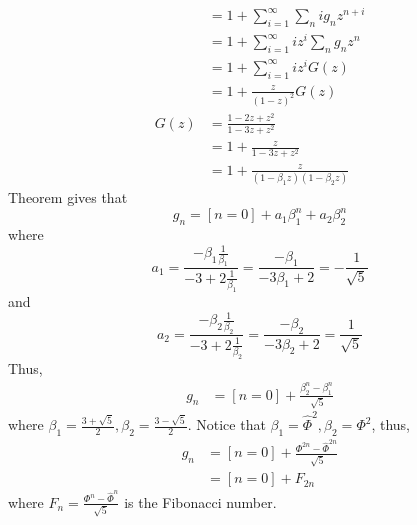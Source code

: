 \documentclass[a4paper,12pt]{article}
\makeatletter
\newtheorem*{solution}{Solution}
\theoremstyle{definition}
\renewenvironment{solution}[1][Solution] {\par\pushQED{\qed}\normalfont\topsep6\p@\@plus6\p@\relax\trivlist\item[\hskip\labelsep\bfseries#1\@addpunct{.}]\ignorespaces}{\popQED\endtrivlist\@endpefalse} \makeatother
\newenvironment{problems}{\begin{list}{}{\renewcommand{\makelabel}[1]{\textbf{##1}\hfil}}}{\end{list}}
\makeatother
\begin{document}
\begin{problems}
\begin{solution}
\begin{align*}
            &= 1 + \sum_{i=1}^\infty \sum_n ig_nz^{n+i}\\
            &= 1 + \sum_{i=1}^\infty iz^i\sum_n g_nz^n\\
            &= 1 + \sum_{i=1}^{\infty} iz^{i}G(z)\\
            &= 1 + \frac{z}{(1-z)^2}G(z)\\
            G(z) &= \frac{1-2z+z^2}{1-3z+z^2} \\
            &= 1 + \frac{z}{1-3z+z^2} \\
            &= 1+ \frac{z}{(1-\beta_1 z)(1-\beta_2 z)}
        \end{align*}
        Theorem gives that
        \begin{equation*}
            g_n = [n=0] + a_1 \beta_1^n + a_2 \beta_2^n
        \end{equation*}
        where
        \begin{equation*}
            a_1 = \frac{-\beta_1 \frac{1}{\beta_1}}{-3+2\frac{1}{\beta_1}} = \frac{-\beta_1}{-3\beta_1+2} = -\frac{1}{\sqrt{5}}
        \end{equation*}
        and 
        \begin{equation*}
            a_2 = \frac{-\beta_2 \frac{1}{\beta_2}}{-3+2\frac{1}{\beta_2}} = \frac{-\beta_2}{-3\beta_2+2}= \frac{1}{\sqrt{5}}
        \end{equation*}
        Thus,
        \begin{align*}
            g_n &= [n=0] + \frac{\beta_2^n-\beta_1^n}{\sqrt[]{5}}
        \end{align*}
        where $\beta_1=\frac{3+\sqrt{5}}{2},\beta_2=\frac{3-\sqrt{5}}{2}$.
        Notice that $\beta_1 = \hat{\Phi}^2,\beta_2 = \Phi^2$, thus,
        \begin{align*}
            g_n &= [n=0] +\frac{\Phi^{2n}-\hat{\Phi}^{2n}}{\sqrt[]{5}} \\
            &= [n=0] + F_{2n}
        \end{align*}
        where $F_n=\frac{\Phi^{n}-\hat{\Phi}^n}{\sqrt{5}}$ is the Fibonacci number.
    \end{solution}
\end{problems}
\end{document}
